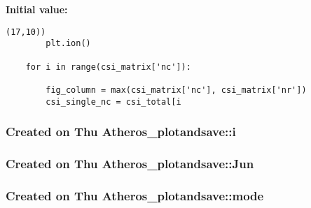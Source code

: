 {\bf Initial value:}

\footnotesize\begin{verbatim}(17,10))  
        plt.ion()
        
    for i in range(csi_matrix['nc']):

        fig_column = max(csi_matrix['nc'], csi_matrix['nr'])              
        csi_single_nc = csi_total[i\end{verbatim}\normalsize 
{}
\subsubsection{\setlength{\rightskip}{0pt plus 5cm}Created on Thu Atheros\_\-plotandsave::i}\label{namespaceAtheros__plotandsave_a5}


\subsubsection{\setlength{\rightskip}{0pt plus 5cm}Created on Thu Atheros\_\-plotandsave::Jun}\label{namespaceAtheros__plotandsave_a0}


\subsubsection{\setlength{\rightskip}{0pt plus 5cm}Created on Thu Atheros\_\-plotandsave::mode}\label{namespaceAtheros__plotandsave_a1}


